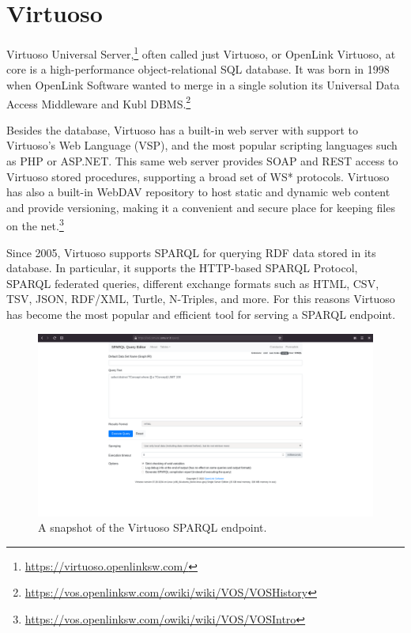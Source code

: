\section{Virtuoso}
\label{sec:virtuoso}

Virtuoso Universal Server,\footnote{\url{https://virtuoso.openlinksw.com/}} often called just Virtuoso, or OpenLink Virtuoso, at core is a high-performance object-relational \acs{SQL} database. It was born in 1998 when OpenLink Software wanted to merge in a single solution its Universal Data Access Middleware and Kubl \acs{DBMS}.\footnote{\url{https://vos.openlinksw.com/owiki/wiki/VOS/VOSHistory}}

Besides the database, Virtuoso has a built-in web server with support to Virtuoso's Web Language (VSP), and the most popular scripting languages such as PHP or ASP.NET. This same web server provides SOAP and REST access to Virtuoso stored procedures, supporting a broad set of WS* protocols.
Virtuoso has also a built-in WebDAV repository to host static and dynamic web content and provide versioning, making it a convenient and secure place for keeping files on the net.\footnote{\url{https://vos.openlinksw.com/owiki/wiki/VOS/VOSIntro}}

Since 2005, Virtuoso supports \ac{SPARQL} for querying \ac{RDF} data stored in its database. In particular, it supports the \ac{HTTP}-based \ac{SPARQL} Protocol, \ac{SPARQL} federated queries, different exchange formats such as \acs{HTML}, \ac{CSV}, \ac{TSV}, \ac{JSON}, \ac{RDF}/\ac{XML}, Turtle, N-Triples, and more. For this reasons Virtuoso has become the most popular and efficient tool for serving a \ac{SPARQL} endpoint.

\begin{figure}[!ht]
  \centering
  \includegraphics[width=\columnwidth]{images/virtuoso/virtuoso-sparql}
  \caption{A snapshot of the Virtuoso \ac{SPARQL} endpoint.}
  \label{fig:virtuoso-sparql}
\end{figure}

